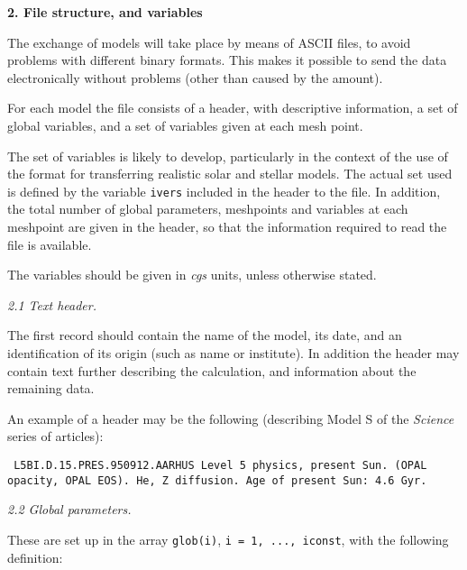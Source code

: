 \mainsect
{\bf 2. File structure, and variables}

The exchange of models will take place by means of ASCII files,
to avoid problems with different binary formats.
This makes it possible to send the data electronically without
problems (other than caused by the amount).

For each model the file consists of a header, with descriptive
information, a set of global variables, and a set of variables
given at each mesh point.

The set of variables is likely to develop, particularly in the
context of the use of the format for transferring realistic
solar and stellar models.
The actual set used is defined by the variable {\tt ivers}
included in the header to the file.
In addition, the total number of global parameters, meshpoints
and variables at each meshpoint are given in the header,
so that the information required to read the file is available.

The variables should be given in {\it cgs} units, unless otherwise stated.

\subsect
{\it 2.1 Text header.}

The first record should contain the name of the model,
its date, and an identification of its origin (such as name or
institute). 
In addition the header may contain text further describing
the calculation, and information about the remaining data.

An example of a header may be the following
(describing Model S of the {\it Science} series of articles):
\medskip
{\obeylines \tt
L5BI.D.15.PRES.950912.AARHUS
Level 5 physics, present Sun. (OPAL opacity, OPAL EOS). He, Z diffusion.
Age of present Sun: 4.6 Gyr.

}

\subsect
{\it 2.2 Global parameters.}

These are set up in the array {\tt glob(i)}, {\tt i = 1, ..., iconst},
with the following definition:

